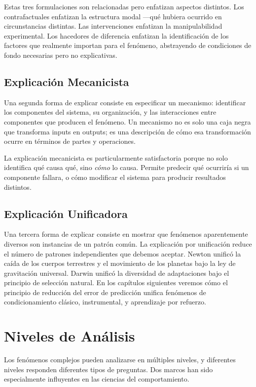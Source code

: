 \documentclass[
  letterpaper,
  DIV=11,
  numbers=noendperiod]{scrreprt}
\begin{document}
Estas tres formulaciones son relacionadas pero enfatizan aspectos
distintos. Los contrafactuales enfatizan la estructura modal ---qué
hubiera ocurrido en circunstancias distintas. Las intervenciones
enfatizan la manipulabilidad experimental. Los hacedores de diferencia
enfatizan la identificación de los factores que realmente importan para
el fenómeno, abstrayendo de condiciones de fondo necesarias pero no
explicativas.

\subsection{Explicación Mecanicista}\label{explicaciuxf3n-mecanicista}

Una segunda forma de explicar consiste en especificar un mecanismo:
identificar los componentes del sistema, su organización, y las
interacciones entre componentes que producen el fenómeno. Un mecanismo
no es solo una caja negra que transforma inputs en outputs; es una
descripción de cómo esa transformación ocurre en términos de partes y
operaciones.

La explicación mecanicista es particularmente satisfactoria porque no
solo identifica qué causa qué, sino \emph{cómo} lo causa. Permite
predecir qué ocurriría si un componente fallara, o cómo modificar el
sistema para producir resultados distintos.

\subsection{Explicación Unificadora}\label{explicaciuxf3n-unificadora}

Una tercera forma de explicar consiste en mostrar que fenómenos
aparentemente diversos son instancias de un patrón común. La explicación
por unificación reduce el número de patrones independientes que debemos
aceptar. Newton unificó la caída de los cuerpos terrestres y el
movimiento de los planetas bajo la ley de gravitación universal. Darwin
unificó la diversidad de adaptaciones bajo el principio de selección
natural. En los capítulos siguientes veremos cómo el principio de
reducción del error de predicción unifica fenómenos de condicionamiento
clásico, instrumental, y aprendizaje por refuerzo.

\section{Niveles de Análisis}\label{niveles-de-anuxe1lisis}

Los fenómenos complejos pueden analizarse en múltiples niveles, y
diferentes niveles responden diferentes tipos de preguntas. Dos marcos
han sido especialmente influyentes en las ciencias del comportamiento.
\end{document}
